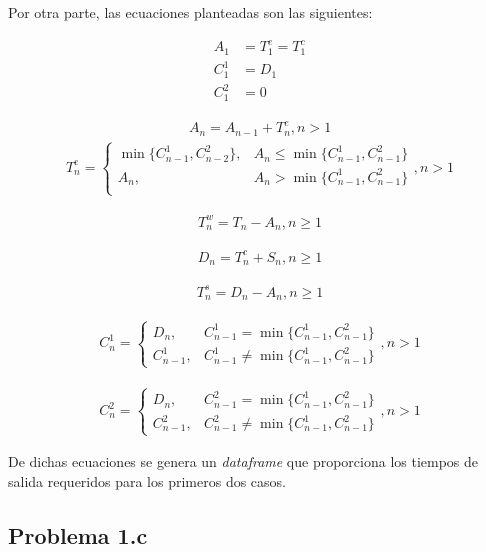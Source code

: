 \documentclass[journal]{IEEEtran}
\begin{document}
Por otra parte, las ecuaciones planteadas son las siguientes: 

\begin{align}
	A_1&= T^e_1 =T^c_1 \\
	C^1_1&=D_1\\
	C^2_1&=0
\end{align}

\begin{align}
	A_n= A_{n-1}+T^e_n, n>1
\end{align}
\begin{align}
	T^e_n= \begin{cases}
		\min\{C^1_{n-1}, C^2_{n-2}\}, & A_n \leq \min\{C^1_{n-1}, C^2_{n-1}\}\\
		A_n, & A_n > \min\{C^1_{n-1}, C^2_{n-1}\}\\
	\end{cases},  n>1 
\end{align}

\begin{align}
	T^w_n = T_n-A_n, n\geq 1
\end{align}

\begin{align}
	D_n = T^c_n+S_n, n\geq 1
\end{align}

\begin{align}
	T^s_n = D_n - A_n, n\geq 1 
\end{align}

\begin{align}
	C^1_n = \begin{cases}
		D_n, & C^1_{n-1}= \min\{C^1_{n-1},C^2_{n-1}\} \\
		 C^1_{n-1},& C^1_{n-1}\neq \min\{C^1_{n-1},C^2_{n-1}\}
	\end{cases},  n>1
\end{align}

\begin{align}
	C^2_n = \begin{cases}
		D_n, & C^2_{n-1}= \min\{C^1_{n-1},C^2_{n-1}\} \\
		C^2_{n-1},& C^2_{n-1}\neq \min\{C^1_{n-1},C^2_{n-1}\}
	\end{cases}, n>1
\end{align}

De dichas ecuaciones se genera un \textit{dataframe} que proporciona los tiempos de salida requeridos para los primeros dos casos. 

\subsection{Problema 1.c}
\end{document}
